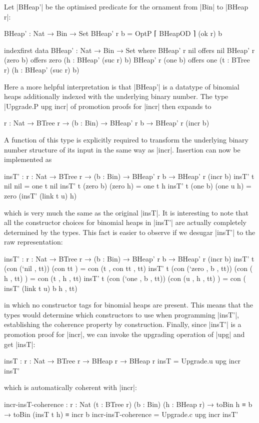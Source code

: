 Let |BHeap'| be the optimised predicate for the ornament from |Bin| to |BHeap r|:
\begin{code}
BHeap' : Nat → Bin → Set
BHeap' r b = OptP ⌈ BHeapOD ⌉ (ok r) b

indexfirst data BHeap' : Nat → Bin → Set where
  BHeap' r nil        offers  nil
  BHeap' r (zero  b)  offers  zero  (h : BHeap' (suc r) b)
  BHeap' r (one   b)  offers  one   (t : BTree r) (h : BHeap' (suc r) b)
\end{code}
Here a more helpful interpretation is that |BHeap'| is a datatype of binomial heaps additionally indexed with the underlying binary number.
The type |Upgrade.P upg incr| of promotion proofs for |incr| then expands to
\begin{code}
{r : Nat} → BTree r → (b : Bin) → BHeap' r b → BHeap' r (incr b)
\end{code}
A function of this type is explicitly required to transform the underlying binary number structure of its input in the same way as |incr|.
Insertion can now be implemented as
\begin{code}
insT' : {r : Nat} → BTree r → (b : Bin) → BHeap' r b → BHeap' r (incr b)
insT' t nil        nil         = one t nil
insT' t (zero  b)  (zero   h)  = one t h
insT' t (one   b)  (one u  h)  = zero (insT' (link t u) h)
\end{code}
which is very much the same as the original |insT|.
It is interesting to note that all the constructor choices for binomial heaps in |insT'| are actually completely determined by the types.
This fact is easier to observe if we desugar |insT'| to the raw representation:
\begin{code}
insT' : {r : Nat} → BTree r → (b : Bin) → BHeap' r b → BHeap' r (incr b)
insT' t (con (`nil   ,      tt))  (con            tt   ) = con (t ,  con tt                , tt)
insT' t (con (`zero  , b ,  tt))  (con (     h ,  tt)  ) = con (t ,  h                     , tt)
insT' t (con (`one   , b ,  tt))  (con (u ,  h ,  tt)  ) = con (     insT' (link t u) b h  , tt)
\end{code}
in which no constructor tags for binomial heaps are present.
This means that the types would determine which constructors to use when programming |insT'|, establishing the coherence property by construction.
Finally, since |insT'| is a promotion proof for |incr|, we can invoke the upgrading operation of |upg| and get |insT|:
\begin{code}
insT : {r : Nat} → BTree r → BHeap r → BHeap r
insT = Upgrade.u upg incr insT'
\end{code}
which is automatically coherent with |incr|:
\begin{code}
incr-insT-coherence :  {r : Nat} (t : BTree r) (b : Bin) (h : BHeap r) →
                       toBin h ≡ b → toBin (insT t h) ≡ incr b
incr-insT-coherence = Upgrade.c upg incr insT'
\end{code}

